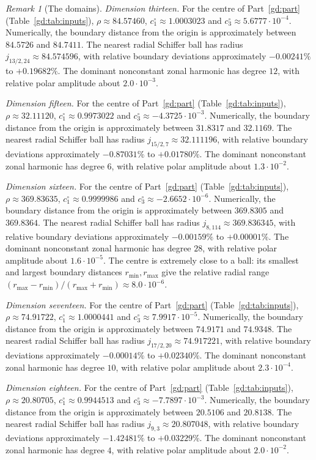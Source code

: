 \documentclass[11pt]{amsart}
\theoremstyle{definition}
\theoremstyle{remark}
\newtheorem{remark}[theorem]{Remark}
\numberwithin{equation}{section}
\begin{document}
\begin{remark}[The domains]
\emph{Dimension thirteen.} For the centre of Part~\ref{gd:part} (Table~\ref{gd:tab:inputs}), $\rho\approx84.57460$, $c_1^\circ\approx1.0003023$ and $c_3^\circ\approx5.6777\cdot10^{-4}$. Numerically, the boundary distance from the origin is approximately between $84.5726$ and $84.7411$. The nearest radial Schiffer ball has radius $j_{13/2,24}\approx84.574596$, with relative boundary deviations approximately $-0.00241\%$ to $+0.19682\%$. The dominant nonconstant zonal harmonic has degree $12$, with relative polar amplitude about $2.0\cdot10^{-3}$.

\emph{Dimension fifteen.} For the centre of Part~\ref{gd:part} (Table~\ref{gd:tab:inputs}), $\rho\approx32.11120$, $c_1^\circ\approx0.9973022$ and $c_3^\circ\approx-4.3725\cdot10^{-3}$. Numerically, the boundary distance from the origin is approximately between $31.8317$ and $32.1169$. The nearest radial Schiffer ball has radius $j_{15/2,7}\approx32.111196$, with relative boundary deviations approximately $-0.87031\%$ to $+0.01780\%$. The dominant nonconstant zonal harmonic has degree $6$, with relative polar amplitude about $1.3\cdot10^{-2}$.

\emph{Dimension sixteen.} For the centre of Part~\ref{gd:part} (Table~\ref{gd:tab:inputs}), $\rho\approx369.83635$, $c_1^\circ\approx0.9999986$ and $c_3^\circ\approx-2.6652\cdot10^{-6}$. Numerically, the boundary distance from the origin is approximately between $369.8305$ and $369.8364$. The nearest radial Schiffer ball has radius $j_{8,114}\approx369.836345$, with relative boundary deviations approximately $-0.00159\%$ to $+0.00001\%$. The dominant nonconstant zonal harmonic has degree $28$, with relative polar amplitude about $1.6\cdot10^{-5}$. The centre is extremely close to a ball: its smallest and largest boundary distances $r_{\min},r_{\max}$ give the relative radial range $(r_{\max}-r_{\min})/(r_{\max}+r_{\min})\approx8.0\cdot10^{-6}$.

\emph{Dimension seventeen.} For the centre of Part~\ref{gd:part} (Table~\ref{gd:tab:inputs}), $\rho\approx74.91722$, $c_1^\circ\approx1.0000441$ and $c_3^\circ\approx7.9917\cdot10^{-5}$. Numerically, the boundary distance from the origin is approximately between $74.9171$ and $74.9348$. The nearest radial Schiffer ball has radius $j_{17/2,20}\approx74.917221$, with relative boundary deviations approximately $-0.00014\%$ to $+0.02340\%$. The dominant nonconstant zonal harmonic has degree $10$, with relative polar amplitude about $2.3\cdot10^{-4}$.

\emph{Dimension eighteen.} For the centre of Part~\ref{gd:part} (Table~\ref{gd:tab:inputs}), $\rho\approx20.80705$, $c_1^\circ\approx0.9944513$ and $c_3^\circ\approx-7.7897\cdot10^{-3}$. Numerically, the boundary distance from the origin is approximately between $20.5106$ and $20.8138$. The nearest radial Schiffer ball has radius $j_{9,3}\approx20.807048$, with relative boundary deviations approximately $-1.42481\%$ to $+0.03229\%$. The dominant nonconstant zonal harmonic has degree $4$, with relative polar amplitude about $2.0\cdot10^{-2}$.


\end{remark}
\end{document}

